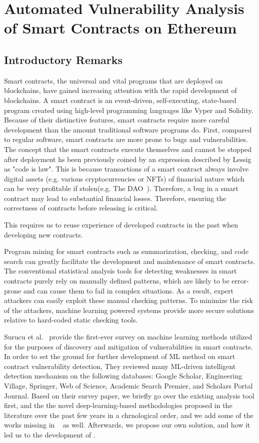 \chapter{Automated Vulnerability Analysis of Smart Contracts on Ethereum} 
\label{ch:Slither-simil}

\section{Introductory Remarks}
Smart contracts, the universal and vital programs that are deployed on blockchains, have gained increasing attention with the rapid development of blockchains.
A smart contract is an event-driven, self-executing, state-based program created using high-level programming languages like Vyper and Solidity.
Because of their distinctive features, smart contracts require more careful development than the amount traditional software programs do.
First, compared to regular software, smart contracts are more prone to bugs and vulnerabilities.
The concept that the smart contracts execute themselves and cannot be stopped after deployment hs been previously coined by an expression described by Lessig~\cite{lessig2009code} as "code is law".
This is because transactions of a smart contract always involve digital assets (e.g. various cryptocurrencies or NFTs) of financial nature which can be very profitable if stolen(e.g. The DAO~\cite{dao}).
Therefore, a bug in a smart contract may lead to substantial financial losses.
Therefore, ensuring the correctness of contracts before releasing is critical.

This requires us to reuse experience of developed contracts in the past when developing new contracts.

Program mining for smart contracts such as summarization, checking, and code search can greatly facilitate the development and maintenance of smart contracts.
The conventional statistical analysis tools for detecting weaknesses in smart contracts purely rely on manually defined patterns, which are likely to be error-prone and can cause them to fail in complex situations.
As a result, expert attackers can easily exploit these manual checking patterns.
To minimize the risk of the attackers, machine learning powered systems provide more secure solutions relative to hard-coded static checking tools.

Surucu et al.~\cite{surucu2022survey} provide the first-ever survey on machine learning methods utilized for the purposes of discovery and mitigation of vulnerabilities in smart contracts.
In order to set the ground for further development of ML method on smart contract vulnerability detection, They reviewed many ML-driven intelligent detection mechanism on the following databases: Google Scholar, Engineering Village, Springer, Web of Science, Academic Search Premier, and Scholars Portal Journal.
Based on their survey paper, we briefly go over the existing analysis tool first, and the the novel deep-learning-based methodologies proposed in the literature over the past few years in a chrnological order, and we add some of the works missing in ~\cite{surucu2022survey} as well.
Afterwards, we propose our own solution, \slithersimil and how it led us to the development of \etherbase.


